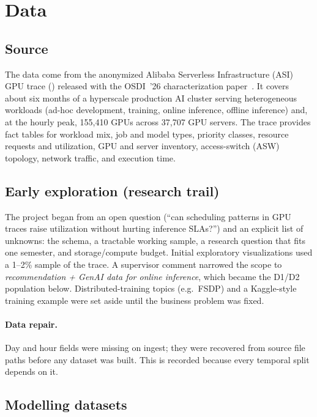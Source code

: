 \documentclass[11pt]{article}
\begin{document}


\section{Data}
\label{sec:data}

\subsection{Source}
The data come from the anonymized Alibaba Serverless Infrastructure (ASI) GPU trace () released with the OSDI~'26 characterization paper~\cite{li2026asi}. It covers about six months of a hyperscale production AI cluster serving heterogeneous workloads (ad-hoc development, training, online inference, offline inference) and, at the hourly peak, 155{,}410 GPUs across 37{,}707 GPU servers. The trace provides fact tables for workload mix, job and model types, priority classes, resource requests and utilization, GPU and server inventory, access-switch (ASW) topology, network traffic, and execution time.

\subsection{Early exploration (research trail)}
The project began from an open question (``can scheduling patterns in GPU traces raise utilization without hurting inference SLAs?'') and an explicit list of unknowns: the schema, a tractable working sample, a research question that fits one semester, and storage/compute budget. Initial exploratory visualizations used a 1--2\% sample of the trace. A supervisor comment narrowed the scope to \emph{recommendation + GenAI data for online inference}, which became the D1/D2 population below. Distributed-training topics (e.g.\ FSDP) and a Kaggle-style training example were set aside until the business problem was fixed.

\paragraph{Data repair.} Day and hour fields were missing on ingest; they were recovered from source file paths before any dataset was built. This is recorded because every temporal split depends on it.

\subsection{Modelling datasets}
\end{document}
